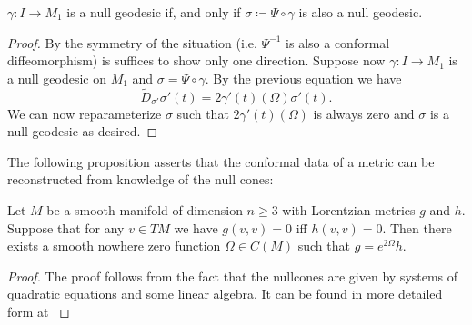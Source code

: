 \begin{proposition} $\gamma:I\to M_1$ is a null geodesic if, and only if $\sigma\coloneqq\Psi\circ\gamma$ is also a null geodesic. 
\end{proposition}
\begin{proof}
By the symmetry of the situation (i.e. $\Psi^{-1}$ is also a conformal diffeomorphism) is suffices to show only one direction.
Suppose now $\gamma:I\to M_1$ is a null geodesic on $M_1$ and $\sigma=\Psi\circ\gamma$. 
By the previous equation we have 
\[
\widetilde{D}_{\sigma'}\sigma'(t) = 2\gamma'(t)(\Omega)\sigma'(t).
\]
We can now reparameterize $\sigma$  such that $2\gamma'(t)(\Omega)$ is always zero and $\sigma$ is a null geodesic as desired.
\end{proof}

The following proposition asserts that the conformal data of a metric can be reconstructed from knowledge of the null cones:
\begin{proposition}\label{prop:metricfromnullcone}
Let $M$ be a smooth manifold of dimension $n\geq 3$ with Lorentzian metrics $g$ and $h$. Suppose that for any $v\in TM$ we have $g(v,v)=0$ iff $h(v,v)=0$. Then there exists a smooth nowhere zero function $\Omega\in C(M)$ such that $g = e^{2\Omega}h$.
\end{proposition}
\begin{proof}
The proof follows from the fact that the nullcones are given by systems of quadratic equations and some linear algebra. It can be found in more detailed form at \cite[Theorem 2.3]{beem}
\end{proof}

